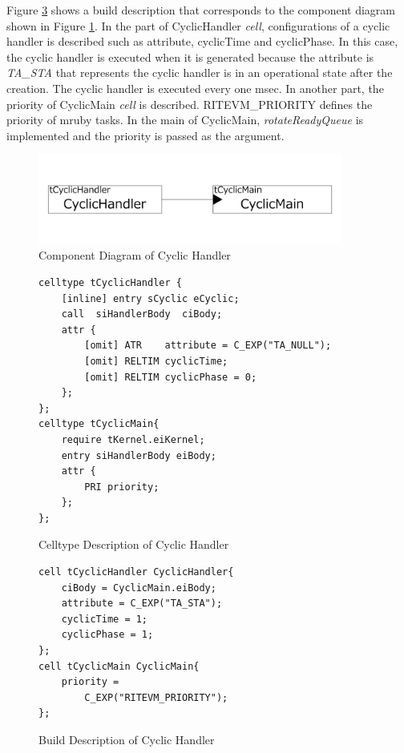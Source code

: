 \documentclass[a4j,12pt,oneside,openany,english]{jsbook}
\begin{document}
Figure \ref{build_cyclic_handler} shows a build description that corresponds to the component diagram shown in Figure \ref{fig:cyclic_handler}.
In the part of CyclicHandler {\it cell}, configurations of a cyclic handler is described such as attribute, cyclicTime and cyclicPhase.
In this case, the cyclic handler is executed when it is generated because the attribute is {\it TA\_STA} that represents the cyclic handler is in an operational state after the creation.
The cyclic handler is executed every one msec.
In another part, the priority of CyclicMain {\it cell} is described.
RITEVM\_PRIORITY defines the priority of mruby tasks.
In the main of CyclicMain, {\it rotateReadyQueue} is implemented and the priority is passed as the argument.

\begin{figure}[t]
    \centering
    \includegraphics[width=10cm,clip]{../EMSOFT2016/figure/cyclic_handler.pdf}
    \caption{Component Diagram of Cyclic Handler}
    \label{fig:cyclic_handler}
\end{figure}
\begin{figure}[t]
    \centering
    \begin{lstlisting}
celltype tCyclicHandler {
    [inline] entry sCyclic eCyclic;
    call  siHandlerBody  ciBody;
    attr {
    	[omit] ATR    attribute = C_EXP("TA_NULL");
    	[omit] RELTIM cyclicTime;
    	[omit] RELTIM cyclicPhase = 0;
    };
};
celltype tCyclicMain{
    require tKernel.eiKernel;
    entry siHandlerBody eiBody;
    attr {
        PRI priority;
    };
};
    \end{lstlisting}
    \caption{Celltype Description of Cyclic Handler}
    \label{celltype_cyclic_handler}
\end{figure}
\begin{figure}[t]
    \centering
    \begin{lstlisting}
cell tCyclicHandler CyclicHandler{
    ciBody = CyclicMain.eiBody;
    attribute = C_EXP("TA_STA");
    cyclicTime = 1;
    cyclicPhase = 1;
};
cell tCyclicMain CyclicMain{
    priority =
        C_EXP("RITEVM_PRIORITY");
};
   \end{lstlisting}
    \caption{Build Description of Cyclic Handler}
    \label{build_cyclic_handler}
\end{figure}
 
\end{document}
